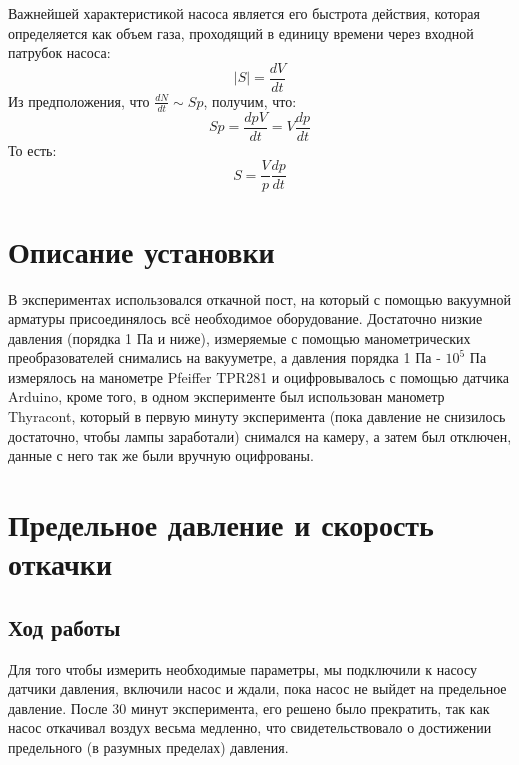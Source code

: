 \documentclass[a4paper,14pt]{extarticle}
\begin{document}
			Важнейшей характеристикой насоса является его быстрота действия, которая определяется как объем газа, проходящий в единицу времени через входной патрубок насоса:
			\begin{equation}
				|S| = \frac{dV}{dt}
			\end{equation}
			Из предположения, что $\frac{dN}{dt} \sim S p$, получим, что:
			\begin{equation}
				S p = \frac{d p V}{dt} = V \frac{dp}{dt}
			\end{equation}
			То есть:
			\begin{equation}
				S = \frac{V}{p} \frac{dp}{dt}
			\end{equation}
	\section{Описание установки}
		В экспериментах использовался откачной пост, на который с помощью вакуумной арматуры присоединялось всё необходимое оборудование. Достаточно низкие давления (порядка 1 Па и ниже), измеряемые с помощью манометрических преобразователей снимались на вакууметре, а давления порядка 1 Па - $10^5$ Па измерялось на манометре Pfeiffer TPR281 и оцифровывалось с помощью датчика Arduino, кроме того, в одном эксперименте был использован манометр Thyracont, который в первую минуту эксперимента (пока давление не снизилось достаточно, чтобы лампы заработали) снимался на камеру, а затем был отключен, данные с него так же были вручную оцифрованы.
	\section{Предельное давление и скорость откачки}
		\subsection{Ход работы}
			Для того чтобы измерить необходимые параметры, мы подключили к насосу датчики давления, включили насос и ждали, пока насос не выйдет на предельное давление. После 30 минут эксперимента, его решено было прекратить, так как насос откачивал воздух весьма медленно, что свидетельствовало о достижении предельного (в разумных пределах) давления.
\end{document}
